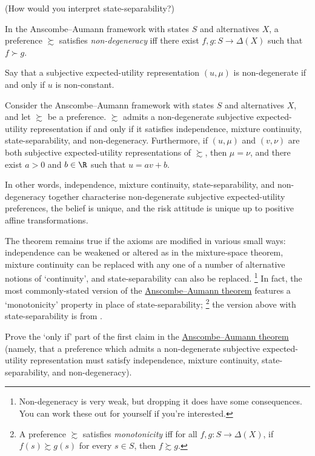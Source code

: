 (How would you interpret state-separability?)

\begin{definition}
	\label{definition:aa_nondegen}
	In the Anscombe--Aumann framework with states $S$ and alternatives $X$, a preference $\succsim$ satisfies \emph{non-degeneracy} iff there exist $f,g : S \to \Delta(X)$ such that $f \succ g$.
\end{definition}

Say that a subjective expected-utility representation $(u,\mu)$ is non-de\-ge\-ne\-rate if and only if $u$ is non-constant.

\begin{namedthm}
	\label{theorem:aa}
	Consider the Anscombe--Aumann framework with states $S$ and alternatives $X$, and let $\succsim$ be a preference. $\succsim$ admits a non-degenerate subjective expected-utility representation if and only if it satisfies independence, mixture continuity, state-separability, and non-degeneracy. Furthermore, if $(u,\mu)$ and $(v,\nu)$ are both subjective expected-utility representations of $\succsim$, then $\mu=\nu$, and there exist $a>0$ and $b \in \R$ such that $u = a v + b$.
\end{namedthm}

In other words, independence, mixture continuity, state-separability, and non-degeneracy together characterise non-degenerate subjective expected-utility preferences, the belief is unique, and the risk attitude is unique up to positive affine transformations.

The theorem remains true if the axioms are modified in various small ways: independence can be weakened or altered as in the mixture-space theorem, mixture continuity can be replaced with any one of a number of alternative notions of `continuity', and state-separability can also be replaced.%
	\footnote{Non-degeneracy is very weak, but dropping it does have some consequences. You can work these out for yourself if you're interested.}
In fact, the most commonly-stated version of the \hyperref[theorem:aa]{Anscombe--Aumann theorem} features a `monotonicity' property in place of state-separability;%
	\footnote{A preference $\succsim$ satisfies \emph{monotonicity} iff for all $f,g : S \to \Delta(X)$, if $f(s) \succsim g(s)$ for every $s \in S$, then $f \succsim g$.}
the version above with state-separability is from \textcite{Kreps1988}.

\begin{exercise}
	\label{exercise:aa_easy}
	Prove the `only if' part of the first claim in the \hyperref[theorem:aa]{Anscombe--Aumann theorem} (namely, that a preference which admits a non-degenerate subjective expected-utility representation must satisfy independence, mixture continuity, state-separability, and non-degeneracy).
\end{exercise}

